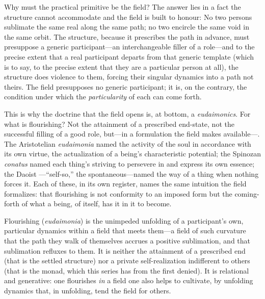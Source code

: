 Why must the practical primitive be the field? The answer lies in a fact the structure cannot accommodate and the field is built to honour:  No two persons sublimate the same real along the same path; no two encircle the same void in the same orbit. The structure, because it prescribes the path in advance, must presuppose a generic participant---an interchangeable filler of a role---and to the precise extent that a real participant departs from that generic template (which is to say, to the precise extent that they are a particular person at all), the structure does violence to them, forcing their singular dynamics into a path not theirs. The field presupposes no generic participant; it is, on the contrary, the condition under which the \emph{particularity} of each can come forth.

This is why the doctrine that the field opens is, at bottom, a \emph{eudaimonics}. For what is flourishing? Not the attainment of a prescribed end-state, not the successful filling of a good role, but---in a formulation the field makes available---. The Aristotelian \emph{eudaimonia} \parencite{aristotle2000} named the activity of the soul in accordance with its own virtue, the actualization of a being's characteristic potential; the Spinozan \emph{conatus} \parencite{spinoza1994} named each thing's striving to persevere in and express its own essence; the Daoist ---``self-so,'' the spontaneous---named the way of a thing when nothing forces it. Each of these, in its own register, names the same intuition the field formalizes: that flourishing is not conformity to an imposed form but the coming-forth of what a being, of itself, has it in it to become.

\begin{claim}
Flourishing (\emph{eudaimonia}) is the unimpeded unfolding of a participant's own, particular dynamics within a field that meets them---a field of such curvature that the path they walk of themselves accrues a positive sublimation, and that sublimation refluxes to them. It is neither the attainment of a prescribed end (that is the settled structure) nor a private self-realization indifferent to others (that is the monad, which this series has from the first denied). It is relational and generative: one flourishes \emph{in} a field one also helps to cultivate, by unfolding dynamics that, in unfolding, tend the field for others.
\end{claim}

